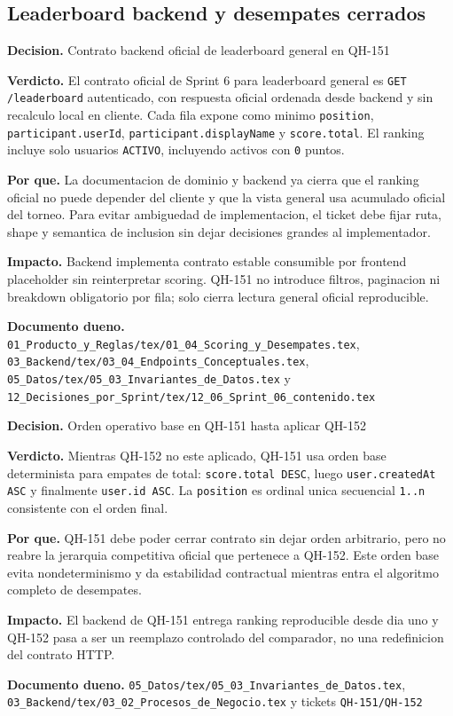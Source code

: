 \subsection{Leaderboard backend y desempates cerrados}

\begin{docnote}
\textbf{Decision.} Contrato backend oficial de leaderboard general en QH-151

\textbf{Verdicto.} El contrato oficial de Sprint 6 para leaderboard general es \texttt{GET /leaderboard} autenticado, con respuesta oficial ordenada desde backend y sin recalculo local en cliente. Cada fila expone como minimo \texttt{position}, \texttt{participant.userId}, \texttt{participant.displayName} y \texttt{score.total}. El ranking incluye solo usuarios \texttt{ACTIVO}, incluyendo activos con \texttt{0} puntos.

\textbf{Por que.} La documentacion de dominio y backend ya cierra que el ranking oficial no puede depender del cliente y que la vista general usa acumulado oficial del torneo. Para evitar ambiguedad de implementacion, el ticket debe fijar ruta, shape y semantica de inclusion sin dejar decisiones grandes al implementador.

\textbf{Impacto.} Backend implementa contrato estable consumible por frontend placeholder sin reinterpretar scoring. QH-151 no introduce filtros, paginacion ni breakdown obligatorio por fila; solo cierra lectura general oficial reproducible.

\textbf{Documento dueno.} \texttt{01\_Producto\_y\_Reglas/tex/01\_04\_Scoring\_y\_Desempates.tex}, \texttt{03\_Backend/tex/03\_04\_Endpoints\_Conceptuales.tex}, \texttt{05\_Datos/tex/05\_03\_Invariantes\_de\_Datos.tex} y \texttt{12\_Decisiones\_por\_Sprint/tex/12\_06\_Sprint\_06\_contenido.tex}
\end{docnote}

\begin{docnote}
\textbf{Decision.} Orden operativo base en QH-151 hasta aplicar QH-152

\textbf{Verdicto.} Mientras QH-152 no este aplicado, QH-151 usa orden base determinista para empates de total: \texttt{score.total DESC}, luego \texttt{user.createdAt ASC} y finalmente \texttt{user.id ASC}. La \texttt{position} es ordinal unica secuencial \texttt{1..n} consistente con el orden final.

\textbf{Por que.} QH-151 debe poder cerrar contrato sin dejar orden arbitrario, pero no reabre la jerarquia competitiva oficial que pertenece a QH-152. Este orden base evita nondeterminismo y da estabilidad contractual mientras entra el algoritmo completo de desempates.

\textbf{Impacto.} El backend de QH-151 entrega ranking reproducible desde dia uno y QH-152 pasa a ser un reemplazo controlado del comparador, no una redefinicion del contrato HTTP.

\textbf{Documento dueno.} \texttt{05\_Datos/tex/05\_03\_Invariantes\_de\_Datos.tex}, \texttt{03\_Backend/tex/03\_02\_Procesos\_de\_Negocio.tex} y tickets \texttt{QH-151/QH-152}
\end{docnote}

